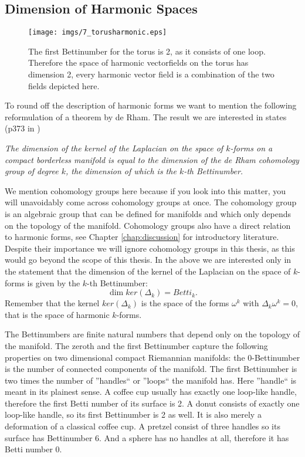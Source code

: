 

\subsection{Dimension of Harmonic Spaces }
\label{subsec:vf_dimHarm}
\begin{figure}%
\begin{center}
\texttt{[image: imgs/7\_torusharmonic.eps]}%
\end{center}
\caption{The first Bettinumber for the torus is 2, as it consists of one loop. Therefore the space of harmonic vectorfields on the torus has dimension 2, every harmonic vector field is a combination of the two fields depicted here.}%
\label{fig:vftorusharmonic}%
\end{figure}

To round off the description of harmonic forms we want to mention the following reformulation of a theorem by de Rham.
The result we are interested in states (p373 in \cite{FRANKEL11})
\vspace{0.5cm}

\emph{The dimension of the kernel of the Laplacian on the space of $k$-forms on a compact borderless manifold is equal to the dimension of the de Rham cohomology group of degree $k$, the dimension of which is the $k$-th Bettinumber.} 

\vspace{0.5cm}
We mention cohomology groups here because if you look into this matter, you will unavoidably come across cohomology groups at once. The cohomology group is an algebraic group that can be defined for manifolds and which only depends on the topology of the manifold. Cohomology groups also have a direct relation to harmonic forms, see Chapter \ref{chap:discussion} for introductory literature. Despite their importance we will ignore cohomology groups in this thesis, as this would go beyond the scope of this thesis.  In the above we are interested only in the statement that the dimension of the kernel of the Laplacian on the space of $k$-forms is given by the $k$-th Bettinumber:
\[\dim ker(\Delta_k) = Betti_k.\]
Remember that the kernel $ker(\Delta_k)$ is the space of the forms $\omega^k$ with $\Delta_k\omega^k = 0$, that is the space of harmonic $k$-forms.

The Bettinumbers are finite natural numbers that depend only on the topology of the manifold. 
The zeroth and the first Bettinumber capture the following properties on two dimensional compact Riemannian manifolds: the 0-Bettinumber is the number of connected components of the manifold. The first Bettinumber is two times the number of ''handles`` or ''loops`` the manifold has. Here ''handle`` is meant in its plainest sense. A coffee cup usually has exactly one loop-like handle, therefore the first Betti number of its surface is 2. A donut consists of exactly one loop-like handle, so its first Bettinumber is 2 as well. It is also merely a deformation of a classical coffee cup. A pretzel consist of three handles so its surface has Bettinumber 6. And a sphere has no handles at all, therefore it has Betti number 0.

